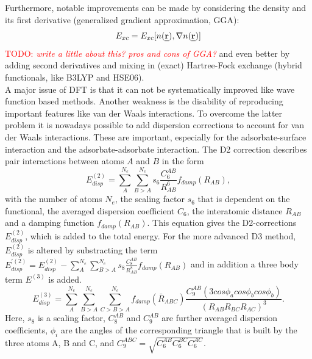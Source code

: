 \documentclass[11pt,DIV=13,BCOR=5mm,a4paper,headinclude]{scrbook}
\newcommand\todo[1]{\textcolor{red}{TODO: \textit{{#1}}}}
\def\mathbi#1{\textbf{\em #1}}
\renewcommand{\vec}[1]{\mathbi{#1}}
\begin{document}
Furthermore, notable improvements can be made by considering the density and its first derivative (generalized gradient approximation, GGA):
\begin{equation}
 E_{xc}=E_{xc}[n(\vec{r}),\nabla n(\vec{r})]
\end{equation}
\todo{write a little about this? pros and cons of GGA\cite{Cohen2008}?} and even better by adding second derivatives and mixing in (exact) Hartree-Fock exchange (hybrid functionals, like B3LYP and HSE06).
\\
A major issue of DFT is that it can not be systematically improved like wave function based methods.
Another weakness is the disability of reproducing important features like van der Waals interactions.
To overcome the latter problem it is nowadays possible to add dispersion corrections to account for van der Waals interactions.
These are important, especially for the adsorbate-surface interaction and the adsorbate-adsorbate interaction.
The D2 correction describes pair interactions between atoms $A$ and $B$ in the form
\begin{equation}\label{eq:d2}
 E_{disp}^{(2)} =\sum\limits_{A}^{N_e}\sum\limits_{B>A}^{N_e} s_6 \frac{C_6^{AB}}{R_{AB}^6}f_{damp}(R_{AB}),
\end{equation}
with the number of atoms $N_e$, the scaling factor $s_6$ that is dependent on the functional, the averaged dispersion coefficient $C_6$, the interatomic distance $R_{AB}$ and a damping function $f_{damp}(R_{AB})$.
This equation gives the D2-corrections $E_{disp}^{(2)}$, which is added to the total energy.
For the more advanced D3 method, $E_{disp}^{(2)}$ is altered by substracting the term $E_{disp}^{\prime(2)}=E_{disp}^{(2)} -\sum\limits_{A}^{N_e}\sum\limits_{B>A}^{N_e} s_8 \frac{C_8^{AB}}{R_{AB}^8}f_{damp}(R_{AB})$ and in addition a three body term $E^{(3)}$ is added.
\begin{equation}
  E_{disp}^{(3)} =\sum\limits_{A}^{N_e}\sum\limits_{B>A}^{N_e}\sum\limits_{C>B>A}^{N_e} f_{damp}(\bar{R}_{ABC}) \frac{C_9^{AB}(3cos\phi_a cos\phi_b cos\phi_b)}{(R_{AB}R_{BC}R_{AC})^3}.
\end{equation}
Here, $s_8$ is a scaling factor, $C_8^{AB}$ and $C_9^{AB}$ are further averaged dispersion coefficients, $\phi_i$ are the angles of the corresponding triangle that is built by the three atoms A, B and C, and $C_9^{ABC}=\sqrt{C_6^{AB}C_6^{BC}C_6^{AC}}$.
\end{document}
